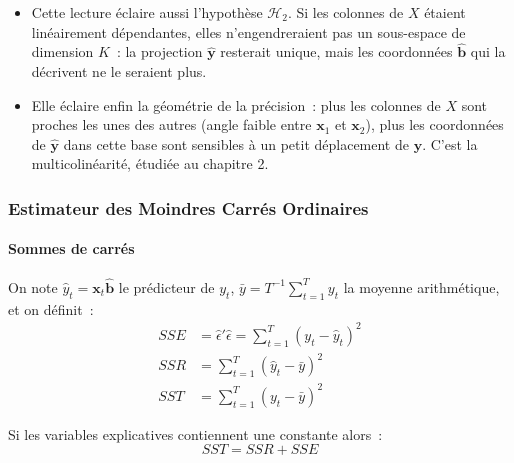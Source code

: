 \documentclass[10pt]{beamer}
\begin{document}
\begin{notes}
\begin{itemize}
  \item Cette lecture éclaire aussi l'hypothèse $\mathcal H_2$. Si les colonnes
    de $X$ étaient linéairement dépendantes, elles n'engendreraient pas un sous-espace
    de dimension $K$~: la projection $\hat{\mathbf y}$ resterait unique, mais les
    coordonnées $\hat{\mathbf b}$ qui la décrivent ne le seraient plus.\newline

  \item Elle éclaire enfin la géométrie de la précision~: plus les colonnes de $X$
    sont \guillemotleft proches \guillemotright{} les unes des autres (angle faible
    entre $\mathbf x_1$ et $\mathbf x_2$), plus les coordonnées de $\hat{\mathbf y}$
    dans cette base sont sensibles à un petit déplacement de $\mathbf y$. C'est la
    multicolinéarité, étudiée au chapitre 2.

  \end{itemize}

\end{notes}

\begin{frame}
  \frametitle{Estimateur des Moindres Carrés Ordinaires}
  \framesubtitle{Sommes de carrés}

  \begin{defn}{}
    On note $\hat y_t = \mathbf x_t \hat{\mathbf b}$ le prédicteur de $y_t$, $\bar y = T^{-1}\sum_{t=1}^T y_t$ la moyenne arithmétique, et on définit~:
    \[
      \begin{split}
        SSE &= \hat\epsilon'\hat\epsilon = \sum_{t=1}^T(y_t-\hat y_t)^2\\
        SSR &= \sum_{t=1}^T(\hat y_t-\bar y)^2\\
        SST &= \sum_{t=1}^T(y_t-\bar y)^2
      \end{split}
    \]
  \end{defn}

  \begin{prop}\label{prop:SST_SSR_SSE}
    Si les variables explicatives contiennent une constante alors~:
    \[
    SST = SSR + SSE
  \]
  \end{prop}

\end{frame}
\end{document}
